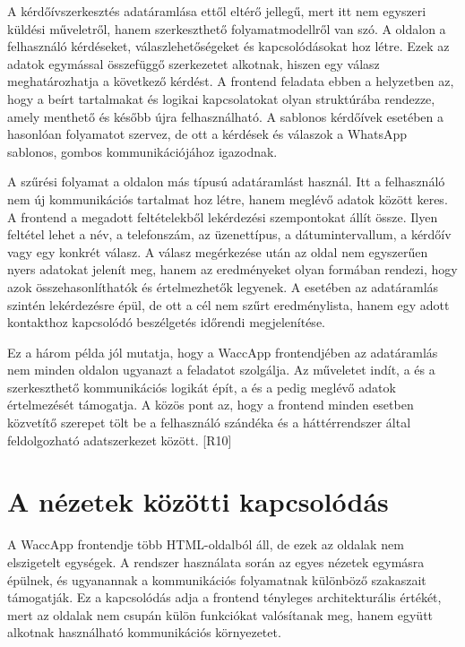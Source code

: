 A kérdőívszerkesztés adatáramlása ettől eltérő jellegű, mert itt nem egyszeri küldési műveletről, hanem szerkeszthető folyamatmodellről van szó. A  oldalon a felhasználó kérdéseket, válaszlehetőségeket és kapcsolódásokat hoz létre. Ezek az adatok egymással összefüggő szerkezetet alkotnak, hiszen egy válasz meghatározhatja a következő kérdést. A frontend feladata ebben a helyzetben az, hogy a beírt tartalmakat és logikai kapcsolatokat olyan struktúrába rendezze, amely menthető és később újra felhasználható. A sablonos kérdőívek esetében a  hasonlóan folyamatot szervez, de ott a kérdések és válaszok a WhatsApp sablonos, gombos kommunikációjához igazodnak. 

A szűrési folyamat a  oldalon más típusú adatáramlást használ. Itt a felhasználó nem új kommunikációs tartalmat hoz létre, hanem meglévő adatok között keres. A frontend a megadott feltételekből lekérdezési szempontokat állít össze. Ilyen feltétel lehet a név, a telefonszám, az üzenettípus, a dátumintervallum, a kérdőív vagy egy konkrét válasz. A válasz megérkezése után az oldal nem egyszerűen nyers adatokat jelenít meg, hanem az eredményeket olyan formában rendezi, hogy azok összehasonlíthatók és értelmezhetők legyenek. A  esetében az adatáramlás szintén lekérdezésre épül, de ott a cél nem szűrt eredménylista, hanem egy adott kontakthoz kapcsolódó beszélgetés időrendi megjelenítése. 

Ez a három példa jól mutatja, hogy a WaccApp frontendjében az adatáramlás nem minden oldalon ugyanazt a feladatot szolgálja. Az  műveletet indít, a  és a  szerkeszthető kommunikációs logikát épít, a  és a  pedig meglévő adatok értelmezését támogatja. A közös pont az, hogy a frontend minden esetben közvetítő szerepet tölt be a felhasználó szándéka és a háttérrendszer által feldolgozható adatszerkezet között. [R10] 

\section{A nézetek közötti kapcsolódás}

A WaccApp frontendje több HTML-oldalból áll, de ezek az oldalak nem elszigetelt egységek. A rendszer használata során az egyes nézetek egymásra épülnek, és ugyanannak a kommunikációs folyamatnak különböző szakaszait támogatják. Ez a kapcsolódás adja a frontend tényleges architekturális értékét, mert az oldalak nem csupán külön funkciókat valósítanak meg, hanem együtt alkotnak használható kommunikációs környezetet. 


